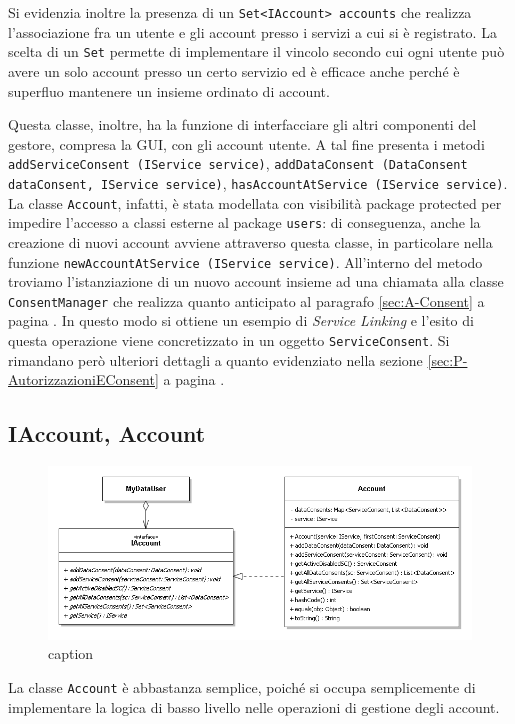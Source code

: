Si evidenzia inoltre la presenza di un \texttt{Set<IAccount> accounts} che realizza l’associazione fra un utente e gli account presso i servizi a cui si \`e registrato. La scelta di un \texttt{Set} permette di implementare il vincolo secondo cui ogni utente pu\`o avere un solo account presso un certo servizio ed \`e efficace anche perch\'e \`e superfluo mantenere un insieme ordinato di account.

Questa classe, inoltre, ha la funzione di interfacciare gli altri componenti del gestore, compresa la GUI, con gli account utente. A tal fine presenta i metodi \texttt{addServiceConsent (IService service)}, \texttt{addDataConsent (DataConsent dataConsent, IService service)}, \texttt{hasAccountAtService (IService service)}.  La classe \texttt{Account}, infatti, \`e stata modellata con visibilit\`a package protected per impedire l’accesso a classi esterne al package \texttt{users}: di conseguenza, anche la creazione di nuovi account avviene attraverso questa classe, in particolare nella funzione \texttt{newAccountAtService (IService service)}. All’interno del metodo troviamo l’istanziazione di un nuovo account insieme ad una chiamata alla classe \texttt{ConsentManager} che realizza quanto anticipato al paragrafo \ref{sec:A-Consent} a pagina \pageref{sec:A-Consent}. In questo modo si ottiene un esempio di \textit{Service Linking} e l’esito di questa operazione viene concretizzato in un oggetto \texttt{ServiceConsent}. Si rimandano per\`o ulteriori dettagli a quanto evidenziato nella sezione \ref{sec:P-AutorizzazioniEConsent} a pagina \pageref{sec:P-AutorizzazioniEConsent}.

\subsection{IAccount, Account}
\label{subsec:P-Account}
\begin{figure} [h]
	\includegraphics[width=\linewidth]{pictures/Accounting-Account.png}
	\caption{caption}
	\label{fig:Accounting-Account}
\end{figure}
La classe \texttt{Account} \`e abbastanza semplice, poich\'e si occupa semplicemente di implementare la logica di basso livello nelle operazioni di gestione degli account.

